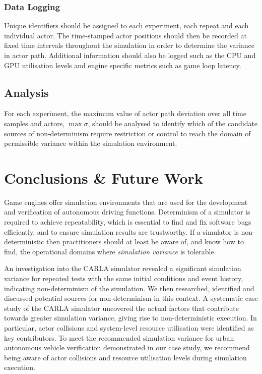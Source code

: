 \subsubsection{Data Logging}
Unique identifiers should be assigned to each experiment, each repeat and each individual actor. 
The time-stamped actor positions should then be recorded at fixed time intervals throughout the simulation in order to determine the variance in actor path. Additional information should also be logged such as the CPU and GPU utilisation levels and engine specific metrics such as game loop latency.

\subsection{Analysis}
For each experiment, the maximum value of actor path deviation over all time samples and actors, $\max\sigma$, should be analysed to identify which of the candidate sources of non-determinism require restriction or control to reach the domain of permissible variance within the simulation environment. 

\section{Conclusions \& Future Work}\label{s:conclusion}

Game engines offer simulation environments that are used for the development and verification of autonomous driving functions. Determinism of a simulator is required to achieve repeatability, which is essential to find and fix software bugs efficiently, and to ensure simulation results are trustworthy. If a simulator is non-deterministic then practitioners should at least be aware of, and know how to find, the operational domains where \textit{simulation variance} is tolerable. 

An investigation into the CARLA simulator revealed a significant simulation variance for repeated tests with the same initial conditions and event history, indicating non-determinism of the simulation. We then researched, identified and discussed potential sources for non-determinism in this context. A systematic case study of the CARLA simulator uncovered the actual factors that contribute towards greater simulation variance, giving rise to non-deterministic execution. In particular, actor collisions and system-level resource utilisation were identified as key contributors. To meet the recommended simulation variance for urban autonomous vehicle verification demonstrated in our case study, we recommend being aware of actor collisions and resource utilisation levels during simulation execution.  

